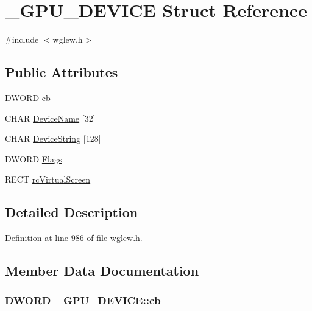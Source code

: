 \hypertarget{struct___g_p_u___d_e_v_i_c_e}{}\section{\+\_\+\+G\+P\+U\+\_\+\+D\+E\+V\+I\+C\+E Struct Reference}
\label{struct___g_p_u___d_e_v_i_c_e}


{\ttfamily \#include $<$wglew.\+h$>$}

\subsection*{Public Attributes}
\begin{DoxyCompactItemize}
\item 
D\+W\+O\+R\+D \hyperlink{struct___g_p_u___d_e_v_i_c_e_afcb22f16ba9e526610489ff56ab78ddb}{cb}
\item 
C\+H\+A\+R \hyperlink{struct___g_p_u___d_e_v_i_c_e_a604bfab61f1a2c5d1e635837d369ba14}{Device\+Name} \mbox{[}32\mbox{]}
\item 
C\+H\+A\+R \hyperlink{struct___g_p_u___d_e_v_i_c_e_aff8b7920ccc85afcd6f325da6cdb0b73}{Device\+String} \mbox{[}128\mbox{]}
\item 
D\+W\+O\+R\+D \hyperlink{struct___g_p_u___d_e_v_i_c_e_a008db9d0f5fc13a5160805f40465f14a}{Flags}
\item 
R\+E\+C\+T \hyperlink{struct___g_p_u___d_e_v_i_c_e_aeb573bbeb3b6c589246720ef259b9a27}{rc\+Virtual\+Screen}
\end{DoxyCompactItemize}


\subsection{Detailed Description}


Definition at line 986 of file wglew.\+h.



\subsection{Member Data Documentation}
\hypertarget{struct___g_p_u___d_e_v_i_c_e_afcb22f16ba9e526610489ff56ab78ddb}{}
\subsubsection[{cb}]{\setlength{\rightskip}{0pt plus 5cm}D\+W\+O\+R\+D \+\_\+\+G\+P\+U\+\_\+\+D\+E\+V\+I\+C\+E\+::cb}\label{struct___g_p_u___d_e_v_i_c_e_afcb22f16ba9e526610489ff56ab78ddb}


